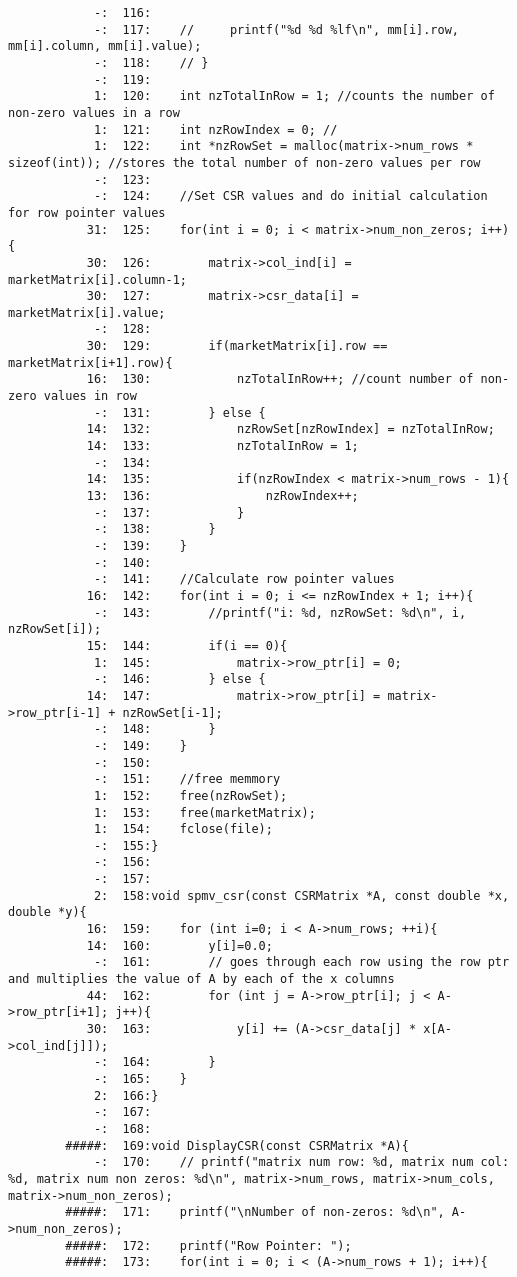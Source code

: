 \documentclass[12pt]{article}
\begin{document}
\begin{mdframed}[style=myboxstyleTerminal1]
\begin{verbatim}
			-:  116:        
			-:  117:    //     printf("%d %d %lf\n", mm[i].row, mm[i].column, mm[i].value);
			-:  118:    // }
			-:  119:
			1:  120:    int nzTotalInRow = 1; //counts the number of non-zero values in a row
			1:  121:    int nzRowIndex = 0; //
			1:  122:    int *nzRowSet = malloc(matrix->num_rows * sizeof(int)); //stores the total number of non-zero values per row
			-:  123:    
			-:  124:    //Set CSR values and do initial calculation for row pointer values
		   31:  125:    for(int i = 0; i < matrix->num_non_zeros; i++){
		   30:  126:        matrix->col_ind[i] = marketMatrix[i].column-1;
		   30:  127:        matrix->csr_data[i] = marketMatrix[i].value;
			-:  128:   
		   30:  129:        if(marketMatrix[i].row == marketMatrix[i+1].row){
		   16:  130:            nzTotalInRow++; //count number of non-zero values in row
			-:  131:        } else {
		   14:  132:            nzRowSet[nzRowIndex] = nzTotalInRow;
		   14:  133:            nzTotalInRow = 1;
			-:  134:
		   14:  135:            if(nzRowIndex < matrix->num_rows - 1){
		   13:  136:                nzRowIndex++;
			-:  137:            }
			-:  138:        }
			-:  139:    }
			-:  140:
			-:  141:    //Calculate row pointer values
		   16:  142:    for(int i = 0; i <= nzRowIndex + 1; i++){ 
			-:  143:        //printf("i: %d, nzRowSet: %d\n", i, nzRowSet[i]);    
		   15:  144:        if(i == 0){
			1:  145:            matrix->row_ptr[i] = 0;  
			-:  146:        } else {
		   14:  147:            matrix->row_ptr[i] = matrix->row_ptr[i-1] + nzRowSet[i-1];
			-:  148:        }
			-:  149:    }
			-:  150:
			-:  151:    //free memmory
			1:  152:    free(nzRowSet);
			1:  153:    free(marketMatrix);
			1:  154:    fclose(file);
			-:  155:}
			-:  156:
			-:  157:
			2:  158:void spmv_csr(const CSRMatrix *A, const double *x, double *y){
		   16:  159:    for (int i=0; i < A->num_rows; ++i){
		   14:  160:        y[i]=0.0;
			-:  161:        // goes through each row using the row ptr and multiplies the value of A by each of the x columns 
		   44:  162:        for (int j = A->row_ptr[i]; j < A->row_ptr[i+1]; j++){
		   30:  163:            y[i] += (A->csr_data[j] * x[A->col_ind[j]]);
			-:  164:        }
			-:  165:    }
			2:  166:}
			-:  167:
			-:  168:
		#####:  169:void DisplayCSR(const CSRMatrix *A){
			-:  170:    // printf("matrix num row: %d, matrix num col: %d, matrix num non zeros: %d\n", matrix->num_rows, matrix->num_cols, matrix->num_non_zeros);
		#####:  171:    printf("\nNumber of non-zeros: %d\n", A->num_non_zeros);
		#####:  172:    printf("Row Pointer: ");
		#####:  173:    for(int i = 0; i < (A->num_rows + 1); i++){

\end{verbatim}
\end{mdframed}
\end{document}
